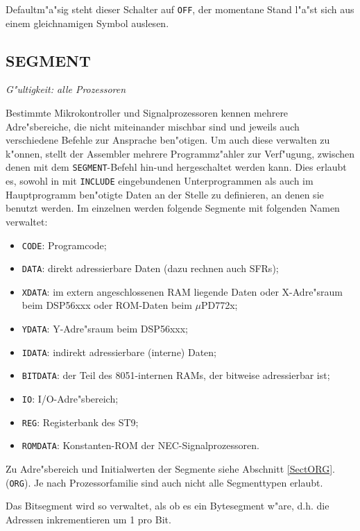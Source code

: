 \documentclass[12pt,a4paper,twoside]{report}
\makeatletter
\newcommand{\tty}[1]{{\tt #1}}
\newcommand{\ttindex}[1]{\index{#1@{\tt #1}}}
\makeatother
\begin{document}
Defaultm"a"sig steht dieser Schalter auf {\tt OFF}, der momentane Stand
l"a"st sich aus einem gleichnamigen Symbol auslesen.


\subsection{SEGMENT}
\ttindex{SEGMENT}
\label{SEGMENT}

{\em G"ultigkeit: alle Prozessoren}

Bestimmte Mikrokontroller und Signalprozessoren kennen mehrere
Adre"sbereiche, die nicht miteinander mischbar sind und jeweils auch
verschiedene Befehle zur Ansprache ben"otigen.  Um auch diese verwalten zu
k"onnen, stellt der Assembler mehrere Programmz"ahler zur Verf"ugung,
zwischen denen mit dem
\tty{SEGMENT}-Befehl hin-und hergeschaltet werden kann.  Dies erlaubt es,
sowohl in mit \tty{INCLUDE} eingebundenen Unterprogrammen als auch im
Hauptprogramm ben"otigte Daten an der Stelle zu definieren, an denen
sie benutzt werden.  Im einzelnen werden folgende Segmente mit folgenden
Namen verwaltet:
\begin{itemize}
\item{\tty{CODE}: Programcode;}
\item{\tty{DATA}: direkt adressierbare Daten (dazu rechnen auch SFRs);}
\item{\tty{XDATA}: im extern angeschlossenen RAM liegende Daten oder
             X-Adre"sraum beim DSP56xxx oder ROM-Daten beim $\mu$PD772x;}
\item{\tty{YDATA}: Y-Adre"sraum beim DSP56xxx;}
\item{\tty{IDATA}: indirekt adressierbare (interne) Daten;}
\item{\tty{BITDATA}: der Teil des 8051-internen RAMs, der bitweise
      adressierbar ist;}
\item{\tty{IO}: I/O-Adre"sbereich;}
\item{\tty{REG}: Registerbank des ST9;}
\item{\tty{ROMDATA}: Konstanten-ROM der NEC-Signalprozessoren.}
\end{itemize}
Zu Adre"sbereich und Initialwerten der Segmente siehe Abschnitt \ref{SectORG}.
(\tty{ORG}).  Je nach Prozessorfamilie sind auch nicht alle Segmenttypen
erlaubt.
\par
Das Bitsegment wird so verwaltet, als ob es ein Bytesegment w"are,
d.h. die Adressen inkrementieren um 1 pro Bit.
\par
\end{document}
